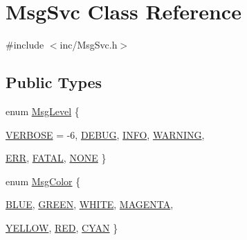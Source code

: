\hypertarget{classMsgSvc}{
\section{MsgSvc Class Reference}
\label{classMsgSvc}
}


{\ttfamily \#include $<$inc/MsgSvc.h$>$}\subsection*{Public Types}
\begin{DoxyCompactItemize}
\item 
enum \hyperlink{classMsgSvc_ae671eb7301996cd049d2da8a65925926}{MsgLevel} \{ \par
\hyperlink{classMsgSvc_ae671eb7301996cd049d2da8a65925926af655256b06494ade5ba830abe5401ec9}{VERBOSE} = -\/6, 
\hyperlink{classMsgSvc_ae671eb7301996cd049d2da8a65925926a1dbdcc82dce88370ec335883c83b38b0}{DEBUG}, 
\hyperlink{classMsgSvc_ae671eb7301996cd049d2da8a65925926ad2fcf3f3e734fc41ee097cc23670ce51}{INFO}, 
\hyperlink{classMsgSvc_ae671eb7301996cd049d2da8a65925926a7cefae88f2ba26b2b05b676a383c834b}{WARNING}, 
\par
\hyperlink{classMsgSvc_ae671eb7301996cd049d2da8a65925926a35a9d7166e9896af4ec8fb33bf5f1772}{ERR}, 
\hyperlink{classMsgSvc_ae671eb7301996cd049d2da8a65925926a59c73cb29edfc9cdf35845e2b1301363}{FATAL}, 
\hyperlink{classMsgSvc_ae671eb7301996cd049d2da8a65925926a9be9ae32fed8e1e6eba4a58692210fbd}{NONE}
 \}
\item 
enum \hyperlink{classMsgSvc_af95de99b5b2e7b6754b6d94ec5526d2c}{MsgColor} \{ \par
\hyperlink{classMsgSvc_af95de99b5b2e7b6754b6d94ec5526d2ca1dcf5030a7b8beb983fd3dc8308eb066}{BLUE}, 
\hyperlink{classMsgSvc_af95de99b5b2e7b6754b6d94ec5526d2ca0b06352b93e105a1b59d246e3ab1473f}{GREEN}, 
\hyperlink{classMsgSvc_af95de99b5b2e7b6754b6d94ec5526d2ca7eb16ade63c14f1eca4a79c0d3316b1e}{WHITE}, 
\hyperlink{classMsgSvc_af95de99b5b2e7b6754b6d94ec5526d2cab9a69d49c8dcce5f9df100509d2b0bf0}{MAGENTA}, 
\par
\hyperlink{classMsgSvc_af95de99b5b2e7b6754b6d94ec5526d2cafc5827dd1cc81b88110254bfbdf1add2}{YELLOW}, 
\hyperlink{classMsgSvc_af95de99b5b2e7b6754b6d94ec5526d2ca5c5593ef0eafd0335e37f9060a0cc097}{RED}, 
\hyperlink{classMsgSvc_af95de99b5b2e7b6754b6d94ec5526d2ca75e9a07cb216444b43234f5092559caf}{CYAN}
 \}
\end{DoxyCompactItemize}
